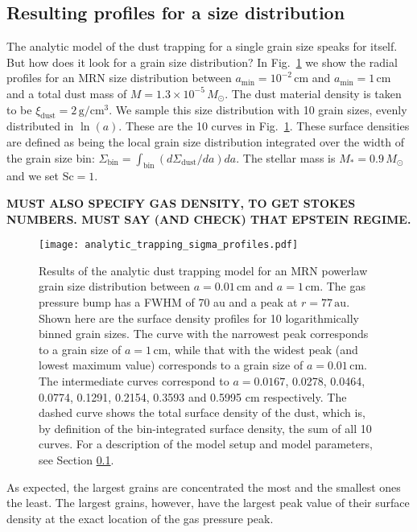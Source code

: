 \documentclass{aa}
\begin{document}
\subsection{Resulting profiles for a size distribution}
\label{sec-anmodel-profiles}
%
The analytic model of the dust trapping for a single grain size speaks for
itself. But how does it look for a grain size distribution? In
Fig.~\ref{fig-anmodel-distribution-sigma} we show the radial profiles for an MRN size
distribution between $a_{\mathrm{min}}=10^{-2}\,\mathrm{cm}$ and
$a_{\mathrm{min}}=1\,\mathrm{cm}$ and a total dust mass of $M=1.3\times
10^{-5}\,M_\odot$. The dust material density is taken to be
$\xi_{\mathrm{dust}}=2\,\mathrm{g}/\mathrm{cm}^3$. We sample this size
distribution with 10 grain sizes, evenly distributed in $\ln(a)$. These are the
10 curves in Fig.~\ref{fig-anmodel-distribution-sigma}. These surface densities are
defined as being the local grain size distribution integrated over the width of
the grain size bin:
$\Sigma_{\mathrm{bin}}=\int_{\mathrm{bin}}(d\Sigma_{\mathrm{dust}}/da)da$. The
stellar mass is $M_{*}=0.9\,M_\odot$ and we set $\mathrm{Sc}=1$.

{\bf MUST ALSO SPECIFY GAS DENSITY, TO GET STOKES NUMBERS. MUST SAY
(AND CHECK) THAT EPSTEIN REGIME.}

\begin{figure}
\centerline{\texttt{[image: analytic\_trapping\_sigma\_profiles.pdf]}}
\caption{\label{fig-anmodel-distribution-sigma}Results of the analytic dust
  trapping model for an MRN powerlaw grain size distribution between
  $a=0.01\,\mathrm{cm}$ and $a=1\,\mathrm{cm}$. The gas pressure bump has a FWHM
  of 70 au and a peak at $r=77\,\mathrm{au}$. Shown here are the surface density
  profiles for 10 logarithmically binned grain sizes. The curve with the
  narrowest peak corresponds to a grain size of $a=1\,\mathrm{cm}$, while that
  with the widest peak (and lowest maximum value) corresponds to a grain size of
  $a=0.01\,\mathrm{cm}$. The intermediate curves correspond to $a=0.0167$,
  0.0278, 0.0464, 0.0774, 0.1291, 0.2154, 0.3593 and 0.5995 $\mathrm{cm}$
  respectively. The dashed curve shows the total surface density of the dust,
  which is, by definition of the bin-integrated surface density, the sum of all
  10 curves. For a description of the model setup and model parameters, see
  Section \ref{sec-anmodel-profiles}.}
\end{figure}

As expected, the largest grains are concentrated the most and the smallest ones
the least. The largest grains, however, have the largest peak value of their
surface density at the exact location of the gas pressure peak.
\end{document}
